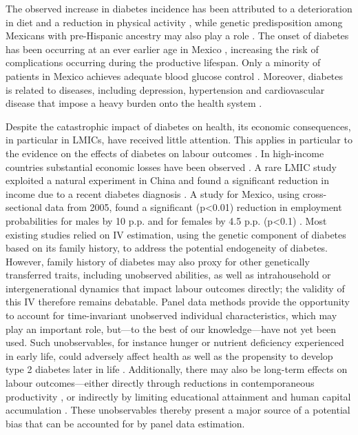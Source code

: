 \documentclass[12pt,english]{article}
\begin{document}
The observed increase in diabetes incidence has been attributed to a deterioration in diet and a reduction in physical activity \parencite{Barquera2008b,Basu2013}, while genetic predisposition among Mexicans with pre-Hispanic ancestry may also play a role \parencite{Williams2013}. The onset of diabetes has been occurring at an ever earlier age in Mexico \parencite{Bello-Chavolla2017a}, increasing the risk of complications occurring during the productive lifespan. Only a minority of patients in Mexico achieves adequate blood glucose control \parencite{Barquera2013}. Moreover, diabetes is related to diseases, including depression, hypertension and cardiovascular disease that impose a heavy burden onto the health system \parencite{WorldHealthOrganization2016}.

Despite the catastrophic impact of diabetes on health, its economic consequences, in particular in \acp{LMIC}, have received little attention. This applies in particular to the evidence on the effects of diabetes on labour outcomes \parencite{Seuring2015a}. In high-income countries substantial economic losses have been observed \parencite{Brown2005,Brown2014,BrownIII2011,Minor2011,Minor2013,Minor2015,Latif2009}. A rare \ac{LMIC} study exploited a natural experiment in China and found a significant reduction in income due to a recent diabetes diagnosis \parencite{Liu2014}. A study for Mexico, using cross-sectional data from 2005, found a significant (p<0.01) reduction in employment probabilities for males by 10 \ac{p.p.} and for females by 4.5 \ac{p.p.} (p<0.1) \parencite{Seuring2015}. Most existing studies relied on \ac{IV} estimation, using the genetic component of diabetes based on its family history, to address the potential endogeneity of diabetes.  However, family history of diabetes may also proxy for other genetically transferred traits, including unobserved abilities, as well as intrahousehold or intergenerational dynamics that impact labour outcomes directly; the validity of this \ac{IV} therefore remains debatable. Panel data methods provide the opportunity to account for time-invariant unobserved individual characteristics, which may play an important role, but---to the best of our knowledge---have not yet been used. Such unobservables, for instance hunger or nutrient deficiency experienced in early life, could adversely affect health as well as the propensity to develop type 2 diabetes later in life \parencite{VanEwijk2011,Sotomayor2013,Li2010b}. Additionally, there may also be long-term effects on labour outcomes---either directly through reductions in contemporaneous productivity \parencite{Currie2013}, or indirectly by limiting educational attainment and human capital accumulation \parencite{Ayyagari2011a}. These unobservables thereby present a major source of a potential bias that can be accounted for by panel data estimation.
\end{document}
